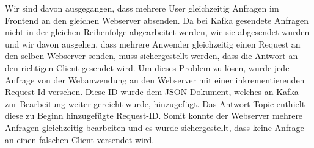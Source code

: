 Wir sind davon ausgegangen, dass mehrere User gleichzeitig Anfragen im Frontend an den gleichen Webserver absenden. Da bei Kafka gesendete Anfragen nicht in der gleichen Reihenfolge abgearbeitet werden, wie sie abgesendet wurden und wir davon ausgehen, dass mehrere Anwender gleichzeitig einen Request an den selben Webserver senden, muss sichergestellt werden, dass die Antwort an den richtigen Client gesendet wird. 
Um dieses Problem zu lösen, wurde jede Anfrage von der Webanwendung an den Webserver mit einer inkrementierenden Request-Id versehen.
Diese ID wurde dem JSON-Dokument, welches an Kafka zur Bearbeitung weiter gereicht wurde, hinzugefügt. Das Antwort-Topic enthielt diese zu Beginn hinzugefügte Request-ID. Somit konnte der Webserver mehrere Anfragen gleichzeitig bearbeiten und es wurde sichergestellt, dass keine Anfrage an einen falschen Client versendet wird.
